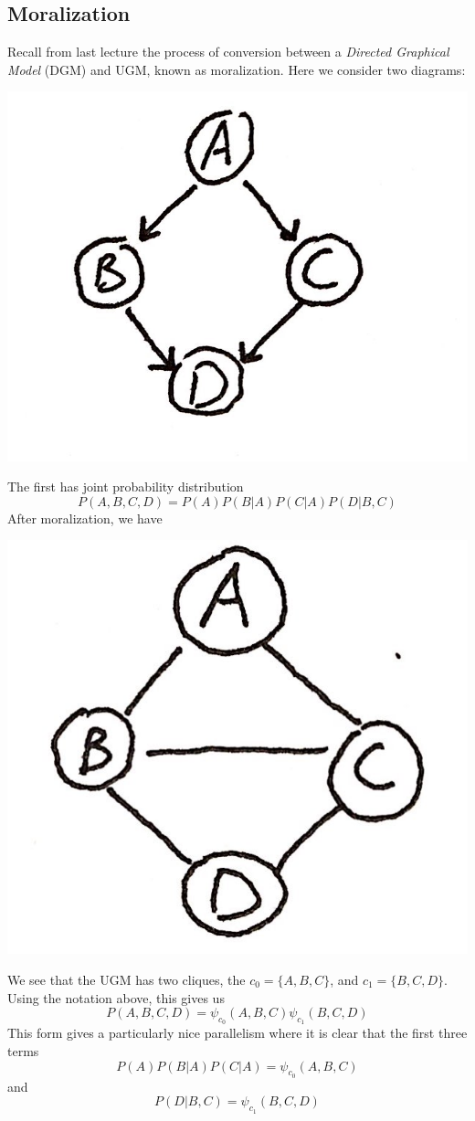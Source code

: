 \documentclass{article}
\begin{document}
\subsection{Moralization}
Recall from last lecture the process of conversion between a \textit{Directed Graphical Model} (DGM) and UGM, known as moralization. Here we consider two diagrams:
\begin{center}
\includegraphics[scale=.15]{DGM1}
\end{center}
The first has joint probability distribution
\[
P(A,B,C,D)=P(A)P(B|A)P(C|A)P(D|B,C)
\]
After moralization, we have
\begin{center}
\includegraphics[scale=.15]{UGM1}
\end{center}
We see that the UGM has two cliques, the $c_0=\{A,B,C\}$, and $c_1=\{B,C,D\}$.
Using the notation above, this gives us
\[
P(A,B,C,D) = \psi_{c_0}(A,B,C)\psi_{c_1}(B,C,D)
\]
This form gives a particularly nice parallelism where it is clear that the first three terms 
\[
P(A)P(B|A)P(C|A)=\psi_{c_0}(A,B,C)
\]
and
\[
P(D|B,C)=\psi_{c_1}(B,C,D)
\]
\end{document}
